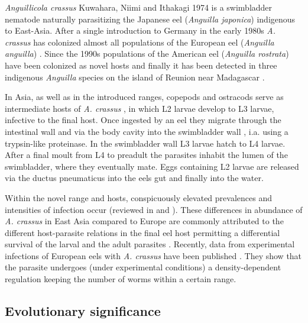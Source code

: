 \textit{Anguillicola crassus} Kuwahara, Niimi and Ithakagi 1974
\cite{kuwahara_Niimi_Itagaki_1974, moravec_anguillicoloides} is a
swimbladder nematode naturally parasitizing the Japanese eel
(\textit{Anguilla japonica}) indigenous to East-Asia. After a single
introduction \cite{wielgoss_population_2008} to Germany in the early
1980s \textit{A. crassus} has colonized almost all populations of the
European eel (\textit{Anguilla anguilla})
\cite{kirk_impact_2003}. Since the 1990s populations of the American
eel (\textit{Anguilla rostrata}) have been colonized as novel hosts
\cite{fries_notes:_1996,barse_exotic_1999, barse_swimbladder_2001} and
finally it has been detected in three indigenous \textit{Anguilla}
species on the island of Reunion near Madagascar
\cite{sasal_parasite_2008}.\



In Asia, as well as in the introduced ranges, copepods and ostracods
serve as intermediate hosts of \textit{A. crassus}
\cite{moravec_first_2005}, in which L2 larvae develop to L3 larvae,
infective to the final host. Once ingested by an eel they migrate
through the intestinal wall and via the body cavity into the
swimbladder wall \cite{haenen_effects_1996}, i.a. using a trypsin-like
proteinase\cite{polzer_identification_1993}. In the swimbladder wall
L3 larvae hatch to L4 larvae. After a final moult from L4 to preadult
the parasites inhabit the lumen of the swimbladder, where they
eventually mate. Eggs containing L2 larvae are released via the ductus
pneumaticus into the eels gut and finally into the
water\cite{de_charleroy_life_1990}.\

Within the novel range and hosts, conspicuously elevated prevalences
and intensities of infection occur (reviewed in
\cite{kirk_impact_2003} and \cite{taraschewski_hosts_2007}). These
differences in abundance of \textit{A. crassus} in East Asia compared
to Europe are commonly attributed to the different host-parasite
relations in the final eel host permitting a differential survival of
the larval and the adult parasites
\cite{knopf_differences_2004}. Recently, data from experimental
infections of European eels with \textit{A. crassus} have been
published \cite{fazio_regulation_2008}. They show that the parasite
undergoes (under experimental conditions) a density-dependent
regulation keeping the number of worms within a certain range.\
  

\subsection{Evolutionary significance}

